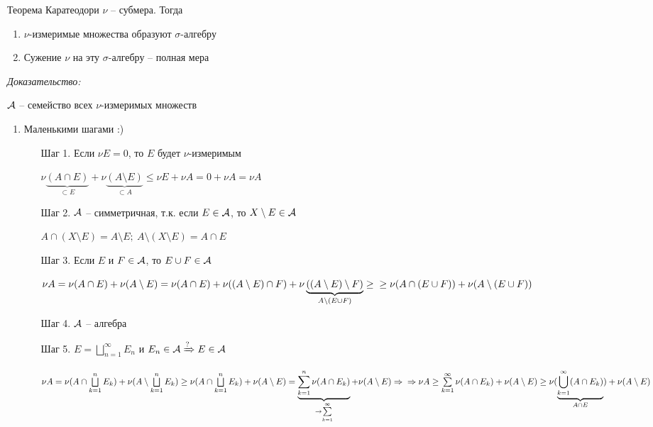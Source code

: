 \documentclass[12pt]{article}
\begin{document}
\begin{theo}{Теорема Каратеодори}
    $\nu$ -- субмера. Тогда 

    \begin{enumerate}
        \item $\nu$-измеримые множества образуют $\sigma$-алгебру 
        \item Сужение $\nu$ на эту $\sigma$-алгебру -- полная мера 
    \end{enumerate}
\end{theo}

\textit{Доказательство:}

$\mathcal{A}$ -- семейство всех $\nu$-измеримых множеств

\begin{enumerate}
    \item Маленькими шагами :)
    
    \begin{itemize}
        \item[Шаг 1.] Если $\nu E = 0$, то $E$ будет $\nu$-измеримым
        
        $\nu \underbrace{(A \cap E)}_{\subset E} + \nu \underbrace{(A \setminus E)}_{\subset A} \leq \nu E + \nu A = 0 + \nu A = \nu A$
    
        \newpage 
    
        \item[Шаг 2.] $\mathcal{A}$ -- симметричная, т.к. если $E \in \mathcal{A}$, то $X \setminus E \in \mathcal{A}$
        
        $A \cap (X \setminus E) = A \setminus E;\ A \setminus (X \setminus E) = A \cap E$
    
        \item[Шаг 3.] Если $E$ и $F \in \mathcal{A}$, то $E \cup F \in \mathcal{A}$
        
        $\nu A = \nu (A \cap E) + \nu (A \setminus E) = \nu (A \cap E) + \nu ((A \setminus E) \cap F) + \nu \underbrace{((A \setminus E) \setminus F)}_{A \setminus (E \cup F)} \geq \\ \geq \nu (A \cap (E \cup F)) + \nu (A \setminus (E \cup F))$
    
        \item[Шаг 4.] $\mathcal{A}$ -- алгебра
        \item[Шаг 5.] $E = \bigsqcup\limits_{n = 1}^\infty E_n$ и $E_n \in \mathcal{A} \xRightarrow[]{?} E \in \mathcal{A}$
        
        $\nu A = \nu (A \cap \bigsqcup\limits_{k = 1}^n E_k) + \nu (A \setminus \bigsqcup\limits_{k = 1}^n E_k) \geq \nu (A \cap \bigsqcup\limits_{k = 1}^n E_k) + \nu (A \setminus E) = \underbrace{\sum\limits_{k = 1}^n \nu (A \cap E_k)}_{\to \sum\limits_{k = 1}^\infty} + \nu (A \setminus E) \Rightarrow \\ 
        \Rightarrow \nu A \geq \sum\limits_{k = 1}^\infty \nu (A \cap E_k) + \nu (A \setminus E) \geq \nu(\underbrace{\bigcup\limits_{k = 1}^\infty (A \cap E_k)}_{A \cap E}) + \nu (A \setminus E)$
    

\end{itemize}
\end{enumerate}
\end{document}

